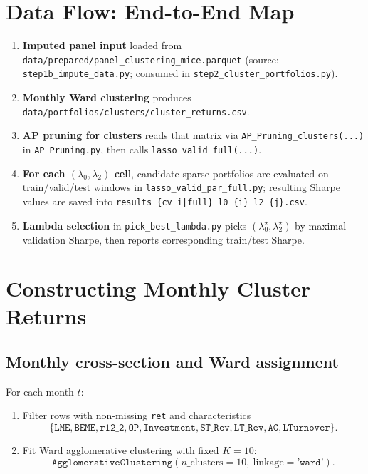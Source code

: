 ﻿\documentclass[11pt]{article}
\begin{document}
\section{Data Flow: End-to-End Map}
\begin{enumerate}[label=\textbf{S\arabic*.}]
  \item \textbf{Imputed panel input} loaded from
  \texttt{data/prepared/panel\_clustering\_mice.parquet}
  (source: \texttt{step1b\_impute\_data.py}; consumed in \texttt{step2\_cluster\_portfolios.py}).

  \item \textbf{Monthly Ward clustering} produces
  \texttt{data/portfolios/clusters/cluster\_returns.csv}.

  \item \textbf{AP pruning for clusters} reads that matrix via
  \texttt{AP\_Pruning\_clusters(...)} in \texttt{AP\_Pruning.py}, then calls
  \texttt{lasso\_valid\_full(...)}.

  \item \textbf{For each $(\lambda_0,\lambda_2)$ cell}, candidate sparse portfolios are evaluated on
  train/valid/test windows in \texttt{lasso\_valid\_par\_full.py}; resulting Sharpe values are saved into
  \texttt{results\_\{cv\_i|full\}\_l0\_\{i\}\_l2\_\{j\}.csv}.

  \item \textbf{Lambda selection} in \texttt{pick\_best\_lambda.py} picks $(\lambda_0^\star,\lambda_2^\star)$ by maximal validation Sharpe, then reports corresponding train/test Sharpe.
\end{enumerate}

\section{Constructing Monthly Cluster Returns}
\subsection{Monthly cross-section and Ward assignment}
For each month $t$:
\begin{enumerate}[label=(\alph*)]
  \item Filter rows with non-missing \texttt{ret} and characteristics
  \[
  \{\texttt{LME},\texttt{BEME},\texttt{r12\_2},\texttt{OP},\texttt{Investment},\texttt{ST\_Rev},\texttt{LT\_Rev},\texttt{AC},\texttt{LTurnover}\}.
  \]
  \item Fit Ward agglomerative clustering with fixed $K=10$:
  \[
  \texttt{AgglomerativeClustering}(n\_\text{clusters}=10,\ \text{linkage}=\texttt{'ward'}).
  \]
\end{enumerate}
\end{document}
